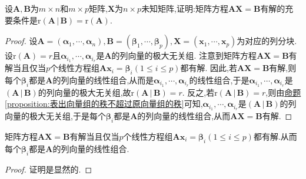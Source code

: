 \documentclass[lang=cn,newtx,10pt,scheme=chinese]{elegantbook}
\begin{document}
\begin{theorem}\label{theorem:矩阵方程有解的充要条件}
设\(\boldsymbol{A},\boldsymbol{B}\)为\(m\times n\)和\(m\times p\)矩阵,\(\boldsymbol{X}\)为\(n\times p\)未知矩阵,证明:矩阵方程\(\boldsymbol{A}\boldsymbol{X}=\boldsymbol{B}\)有解的充要条件是\(\mathrm{r}\left( \boldsymbol{A}\,|\,\boldsymbol{B} \right)=\mathrm{r}(\boldsymbol{A})\).
\end{theorem}
\begin{proof}
设\(\boldsymbol{A}=(\boldsymbol{\alpha}_1,\cdots,\boldsymbol{\alpha}_n),\boldsymbol{B}=(\boldsymbol{\beta}_1,\cdots,\boldsymbol{\beta}_p),\boldsymbol{X}=(\boldsymbol{x}_1,\cdots,\boldsymbol{x}_p)\)为对应的列分块. 设\(\mathrm{r}(\boldsymbol{A}) = r\)且\(\boldsymbol{\alpha}_{i_1},\cdots,\boldsymbol{\alpha}_{i_r}\)是\(\boldsymbol{A}\)的列向量的极大无关组. 注意到矩阵方程\(\boldsymbol{A}\boldsymbol{X}=\boldsymbol{B}\)有解当且仅当\(p\)个线性方程组\(\boldsymbol{A}\boldsymbol{x}_i=\boldsymbol{\beta}_i(1\leq i\leq p)\)都有解. 因此,若\(\boldsymbol{A}\boldsymbol{X}=\boldsymbol{B}\)有解,则每个\(\boldsymbol{\beta}_i\)都是\(\boldsymbol{A}\)的列向量的线性组合,从而是\(\boldsymbol{\alpha}_{i_1},\cdots,\boldsymbol{\alpha}_{i_r}\)的线性组合,于是\(\boldsymbol{\alpha}_{i_1},\cdots,\boldsymbol{\alpha}_{i_r}\)是\(\left( \boldsymbol{A}\,|\,\boldsymbol{B} \right)\)的列向量的极大无关组,故\(\mathrm{r}\left( \boldsymbol{A}\,|\,\boldsymbol{B} \right) = r\). 反之,若\(\mathrm{r}\left( \boldsymbol{A}\,|\,\boldsymbol{B} \right) = r\),则由\hyperref[proposition:表出向量组的秩不超过原向量组的秩]{命题\ref{proposition:表出向量组的秩不超过原向量组的秩}}可知,\(\boldsymbol{\alpha}_{i_1},\cdots,\boldsymbol{\alpha}_{i_r}\)是\(\left( \boldsymbol{A}\,|\,\boldsymbol{B} \right)\)的列向量的极大无关组,于是每个\(\boldsymbol{\beta}_i\)都是\(\boldsymbol{A}\)的列向量的线性组合,从而\(\boldsymbol{A}\boldsymbol{X}=\boldsymbol{B}\)有解.
\end{proof}

\begin{proposition}
矩阵方程\(\boldsymbol{A}\boldsymbol{X}=\boldsymbol{B}\)有解当且仅当\(p\)个线性方程组\(\boldsymbol{A}\boldsymbol{x}_i=\boldsymbol{\beta}_i(1\leq i\leq p)\)都有解.从而每个\(\boldsymbol{\beta}_i\)都是\(\boldsymbol{A}\)的列向量的线性组合.
\end{proposition}
\begin{proof}
证明是显然的.
\end{proof}
\end{document}
